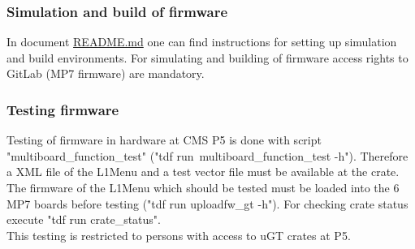 \subsubsection{Simulation and build of firmware}
\label{sec:fw:sim_build_firmware}

In document \href{https://github.com/cms-l1-globaltrigger/mp7_ugt_legacy/blob/master/README.md}{README.md} one can find instructions for setting up simulation and build environments. For simulating and building of firmware access rights to GitLab (MP7 firmware) are mandatory.

\subsubsection{Testing firmware}
\label{sec:fw:testing_firmware}

Testing of firmware in hardware at CMS P5 is done with script "multiboard\_function\_test" ("tdf run\ multiboard\_function\_test -h"). Therefore a XML file of the L1Menu and a test vector file must be available at the crate. The firmware of the L1Menu which should be tested must be loaded into the 6 MP7 boards before testing ("tdf run uploadfw\_gt -h"). For checking crate status execute "tdf run crate\_status".\\
This testing is restricted to persons with access to uGT crates at P5.

\clearpage
